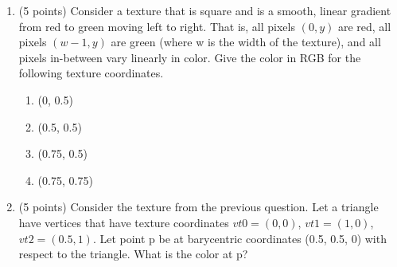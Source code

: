 \documentclass[12pt]{letter}
\begin{document}
\begin{enumerate}
	
	\item (5 points)
	Consider a texture that is square and is a smooth, linear gradient from red to green moving left to right.
	That is, all pixels $(0, y)$ are red, all pixels $(w − 1, y)$ are green (where w is the width of
the texture), and all pixels in-between vary linearly in color. Give the color in RGB for the following
texture coordinates.
	\begin{enumerate}
		\item (0, 0.5)
		\item (0.5, 0.5)
		\item (0.75, 0.5)
		\item (0.75, 0.75)
	\end{enumerate}

	\item (5 points)
	Consider the texture from the previous question. Let a triangle have vertices that have texture coordinates $vt0 = (0, 0)$, $vt1 
	= (1, 0)$, $vt2 = (0.5, 1)$. 
	Let point p be at barycentric coordinates (0.5, 0.5, 0) with respect to the triangle.
	What is the color at p?
\end{enumerate}
\end{document}
